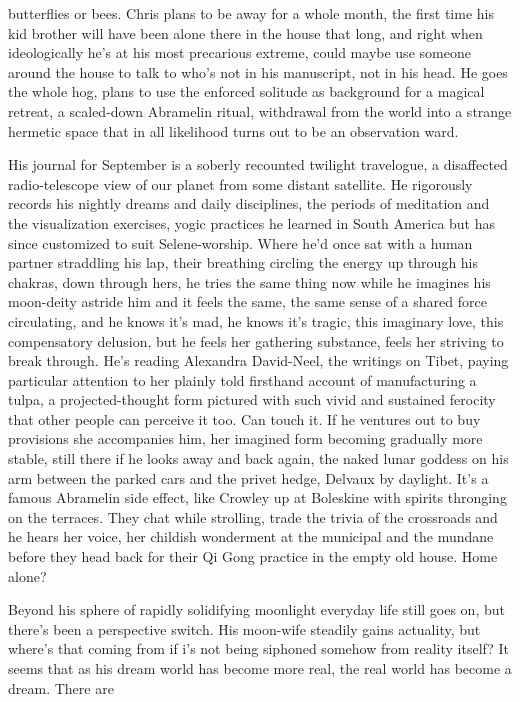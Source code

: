 \documentclass[
]{article}
\begin{document}
butterflies or bees. Chris plans to be away for a whole month, the first
time his kid brother will have been alone there in the house that long,
and right when ideologically he's at his most precarious extreme, could
maybe use someone around the house to talk to who's not in his
manuscript, not in his head. He goes the whole hog, plans to use the
enforced solitude as background for a magical retreat, a scaled-down
Abramelin ritual, withdrawal from the world into a strange hermetic
space that in all likelihood turns out to be an observation ward. \par
His journal for September is a soberly recounted twilight
travelogue, a disaffected radio-telescope view of our planet from some
distant satellite. He rigorously records his nightly dreams and daily
disciplines, the periods of meditation and the visualization exercises,
yogic practices he learned in South America but has since customized to
suit Selene-worship. Where he'd once sat with a human partner straddling
his lap, their breathing circling the energy up through his chakras,
down through hers, he tries the same thing now while he imagines his
moon-deity astride him and it feels the same, the same sense of a shared
force circulating, and he knows it's mad, he knows it's tragic, this
imaginary love, this compensatory delusion, but he feels her gathering
substance, feels her striving to break through. He's reading Alexandra
David-Neel, the writings on Tibet, paying particular attention to her
plainly told firsthand account of manufacturing a tulpa, a
projected-thought form pictured with such vivid and sustained ferocity
that other people can perceive it too. Can touch it. If he ventures out
to buy provisions she accompanies him, her imagined form becoming
gradually more stable, still there if he looks away and back again, the
naked lunar goddess on his arm between the parked cars and the privet
hedge, Delvaux by daylight. It's a famous Abramelin side effect, like
Crowley up at Boleskine with spirits thronging on the terraces. They
chat while strolling, trade the trivia of the crossroads and he hears
her voice, her childish wonderment at the municipal and the mundane
before they head back for their Qi Gong practice in the empty old house.
Home alone? \par
Beyond his sphere of rapidly solidifying moonlight everyday life
still goes on, but there's been a perspective switch. His moon-wife
steadily gains actuality, but where's that coming from if i's not being
siphoned somehow from reality itself? It seems that as his dream world
has become more real, the real world has become a dream. There are
\end{document}

